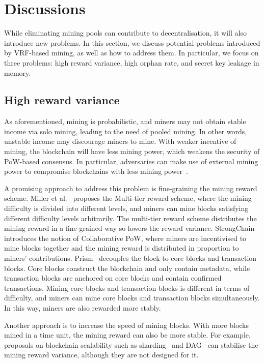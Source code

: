 \section{Discussions}
\label{sec:discussions}

While eliminating mining pools can contribute to decentralisation, it will also introduce new problems.
In this section, we discuss potential problems introduced by VRF-based mining, as well as how to address them.
In particular, we focus on three problems: high reward variance, high orphan rate, and secret key leakage in memory.

\subsection{High reward variance}

As aforementioned, mining is probabilistic, and miners may not obtain stable income via solo mining, leading to the need of pooled mining.
In other words, unstable income may discourage miners to mine.
With weaker incentive of mining, the blockchain will have less mining power, which weakens the security of PoW-based consensus.
In particular, adversaries can make use of external mining power to compromise blockchains with less mining power~\cite{hansucker}.

A promising approach to address this problem is fine-graining the mining reward scheme.
Miller et al.~\cite{miller2015nonoutsourceable} proposes the Multi-tier reward scheme, where the mining difficulty is divided into different levels, and miners can mine blocks satisfying different difficulty levels arbitrarily.
The multi-tier reward scheme distributes the mining reward in a fine-grained way so lowers the reward variance.
StrongChain~\cite{szalachowski2019strongchain} introduces the notion of Collaborative PoW, where miners are incentivised to mine blocks together and the mining reward is distributed in proportion to miners' contributions.
Prism~\cite{bagaria2019prism} decouples the block to core blocks and transaction blocks.
Core blocks construct the blockchain and only contain metadata, while transaction blocks are anchored on core blocks and contain confirmed transactions.
Mining core blocks and transaction blocks is different in terms of difficulty, and miners can mine core blocks and transaction blocks simultaneously.
In this way, miners are also rewarded more stably.

Another approach is to increase the speed of mining blocks.
With more blocks mined in a time unit, the mining reward can also be more stable.
For example, proposals on blockchain scalability such as sharding~\cite{wang2019monoxide} and DAG~\cite{li2018scaling} can stabilise the mining reward variance, although they are not designed for it.





